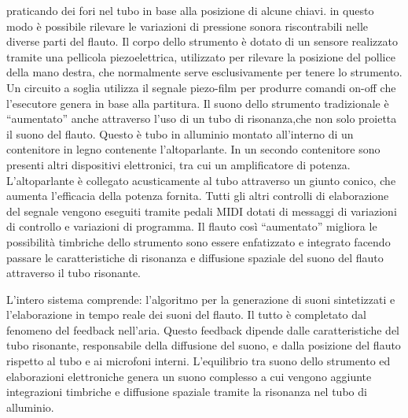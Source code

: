 praticando dei fori nel tubo in base alla posizione di alcune chiavi.  in questo modo è possibile rilevare le variazioni di pressione sonora riscontrabili nelle diverse parti del flauto.
Il corpo dello strumento è dotato di un sensore realizzato tramite una pellicola piezoelettrica,  utilizzato per rilevare la posizione del pollice della mano destra, che normalmente serve esclusivamente per tenere lo strumento.
Un circuito a soglia utilizza il segnale piezo-film  per produrre comandi on-off che l'esecutore genera in base alla partitura.
Il suono dello strumento tradizionale è “aumentato” anche attraverso l'uso di un tubo di risonanza,che non solo proietta il suono del flauto. Questo è  tubo in alluminio montato all'interno di un contenitore in legno contenente l'altoparlante. In un secondo contenitore sono presenti altri dispositivi elettronici, tra cui un amplificatore di potenza. L'altoparlante è collegato acusticamente al tubo attraverso un giunto conico, che aumenta l’efficacia della potenza fornita. 
Tutti gli altri controlli di elaborazione del segnale vengono eseguiti tramite pedali MIDI dotati di messaggi di variazioni di controllo e variazioni di programma.
Il flauto così “aumentato” migliora le possibilità timbriche dello strumento sono essere enfatizzato e integrato facendo passare le caratteristiche di risonanza e diffusione spaziale del suono del flauto attraverso il tubo risonante.

L'intero sistema comprende: l'algoritmo per la generazione di suoni sintetizzati e l’elaborazione in tempo reale dei suoni del flauto. 
Il tutto è completato dal fenomeno del feedback nell'aria. 
Questo feedback dipende dalle caratteristiche del tubo risonante, responsabile della diffusione del suono,
e dalla posizione del flauto rispetto al tubo e ai microfoni interni.
L’equilibrio tra suono dello strumento ed elaborazioni elettroniche genera un suono complesso a cui  vengono aggiunte integrazioni timbriche e diffusione spaziale tramite la risonanza nel tubo di alluminio.
